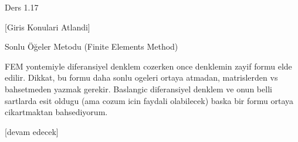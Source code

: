 \documentclass[12pt,fleqn]{article}\usepackage{../../common}
\begin{document}
Ders 1.17

[Giris Konulari Atlandi]

Sonlu Öğeler Metodu (Finite Elements Method)

FEM yontemiyle diferansiyel denklem cozerken once denklemin zayif formu elde
edilir. Dikkat, bu formu daha sonlu ogeleri ortaya atmadan, matrislerden vs
bahsetmeden yazmak gerekir. Baslangic diferansiyel denklem ve onun belli
sartlarda esit oldugu (ama cozum icin faydali olabilecek) baska bir formu
ortaya cikartmaktan bahsediyorum. 




[devam edecek]
\end{document}
